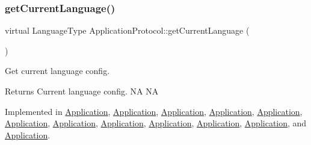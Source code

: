 \mbox{\label{classApplicationProtocol_a44034ed02f9dd0fc59264f74f9ef9b17}} 
\subsubsection{\texorpdfstring{get\+Current\+Language()}{getCurrentLanguage()}\hspace{0.1cm}{\footnotesize\ttfamily [2/2]}}
{\footnotesize\ttfamily virtual Language\+Type Application\+Protocol\+::get\+Current\+Language (\begin{DoxyParamCaption}{ }\end{DoxyParamCaption})\hspace{0.3cm}{\ttfamily [pure virtual]}}



Get current language config. 

\begin{DoxyReturn}{Returns}
Current language config.  NA  NA 
\end{DoxyReturn}


Implemented in \hyperlink{classApplication_ac972f15de44614b03604fb4e3e05cab3}{Application}, \hyperlink{classApplication_ac972f15de44614b03604fb4e3e05cab3}{Application}, \hyperlink{classApplication_ac972f15de44614b03604fb4e3e05cab3}{Application}, \hyperlink{classApplication_ac972f15de44614b03604fb4e3e05cab3}{Application}, \hyperlink{classApplication_ac972f15de44614b03604fb4e3e05cab3}{Application}, \hyperlink{classApplication_a78d257080c2dc2ff625bb4b5835667df}{Application}, \hyperlink{classApplication_ac972f15de44614b03604fb4e3e05cab3}{Application}, \hyperlink{classApplication_ac972f15de44614b03604fb4e3e05cab3}{Application}, \hyperlink{classApplication_a3fd3aeff0465fffe782af5b1441131c6}{Application}, \hyperlink{classApplication_a53107377c9d2531f171ba6f619aae78f}{Application}, \hyperlink{classApplication_a3fd3aeff0465fffe782af5b1441131c6}{Application}, and \hyperlink{classApplication_a3fd3aeff0465fffe782af5b1441131c6}{Application}.

\mbox{\label{classApplicationProtocol_a4cb7a696dd51fee3ebb3075f0cca1455}} 
